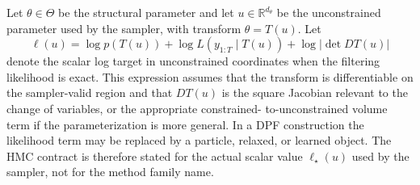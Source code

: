 Let $\theta\in\Theta$ be the structural parameter and let
$u\in\mathbb{R}^{d_\theta}$ be the unconstrained parameter used by the sampler,
with transform $\theta=T(u)$.  Let
\[
  \ell(u)
  =
  \log p(T(u))+\log L(y_{1:T}\mid T(u))+\log\left|\det DT(u)\right|
\]
denote the scalar log target in unconstrained coordinates when the filtering
likelihood is exact.  This expression assumes that the transform is
differentiable on the sampler-valid region and that $DT(u)$ is the square
Jacobian relevant to the change of variables, or the appropriate constrained-
to-unconstrained volume term if the parameterization is more general.  In a DPF
construction the likelihood term may be replaced by a particle, relaxed, or
learned object.  The HMC contract is therefore stated for the actual scalar
value $\ell_\star(u)$ used by the sampler, not for the method family name.

